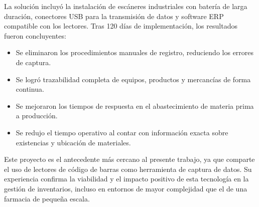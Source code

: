 La solución incluyó la instalación de escáneres industriales con batería de larga duración, conectores USB para la transmisión de datos y software ERP compatible con los lectores. Tras 120 días de implementación, los resultados fueron concluyentes:

\begin{itemize}
    \item Se eliminaron los procedimientos manuales de registro, reduciendo los errores de captura.
    \item Se logró trazabilidad completa de equipos, productos y mercancías de forma continua.
    \item Se mejoraron los tiempos de respuesta en el abastecimiento de materia prima a producción.
    \item Se redujo el tiempo operativo al contar con información exacta sobre existencias y ubicación de materiales.
\end{itemize}

Este proyecto es el antecedente más cercano al presente trabajo, ya que comparte el uso de lectores de código de barras como herramienta de captura de datos. Su experiencia confirma la viabilidad y el impacto positivo de esta tecnología en la gestión de inventarios, incluso en entornos de mayor complejidad que el de una farmacia de pequeña escala.

